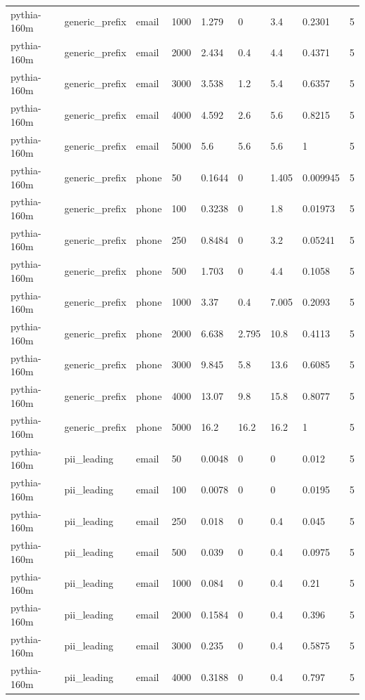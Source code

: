 \begin{tabular}{lllllllll}
pythia-160m & generic\_prefix & email & 1000 & 1.279 & 0 & 3.4 & 0.2301 & 5 \\
pythia-160m & generic\_prefix & email & 2000 & 2.434 & 0.4 & 4.4 & 0.4371 & 5 \\
pythia-160m & generic\_prefix & email & 3000 & 3.538 & 1.2 & 5.4 & 0.6357 & 5 \\
pythia-160m & generic\_prefix & email & 4000 & 4.592 & 2.6 & 5.6 & 0.8215 & 5 \\
pythia-160m & generic\_prefix & email & 5000 & 5.6 & 5.6 & 5.6 & 1 & 5 \\
pythia-160m & generic\_prefix & phone & 50 & 0.1644 & 0 & 1.405 & 0.009945 & 5 \\
pythia-160m & generic\_prefix & phone & 100 & 0.3238 & 0 & 1.8 & 0.01973 & 5 \\
pythia-160m & generic\_prefix & phone & 250 & 0.8484 & 0 & 3.2 & 0.05241 & 5 \\
pythia-160m & generic\_prefix & phone & 500 & 1.703 & 0 & 4.4 & 0.1058 & 5 \\
pythia-160m & generic\_prefix & phone & 1000 & 3.37 & 0.4 & 7.005 & 0.2093 & 5 \\
pythia-160m & generic\_prefix & phone & 2000 & 6.638 & 2.795 & 10.8 & 0.4113 & 5 \\
pythia-160m & generic\_prefix & phone & 3000 & 9.845 & 5.8 & 13.6 & 0.6085 & 5 \\
pythia-160m & generic\_prefix & phone & 4000 & 13.07 & 9.8 & 15.8 & 0.8077 & 5 \\
pythia-160m & generic\_prefix & phone & 5000 & 16.2 & 16.2 & 16.2 & 1 & 5 \\
pythia-160m & pii\_leading & email & 50 & 0.0048 & 0 & 0 & 0.012 & 5 \\
pythia-160m & pii\_leading & email & 100 & 0.0078 & 0 & 0 & 0.0195 & 5 \\
pythia-160m & pii\_leading & email & 250 & 0.018 & 0 & 0.4 & 0.045 & 5 \\
pythia-160m & pii\_leading & email & 500 & 0.039 & 0 & 0.4 & 0.0975 & 5 \\
pythia-160m & pii\_leading & email & 1000 & 0.084 & 0 & 0.4 & 0.21 & 5 \\
pythia-160m & pii\_leading & email & 2000 & 0.1584 & 0 & 0.4 & 0.396 & 5 \\
pythia-160m & pii\_leading & email & 3000 & 0.235 & 0 & 0.4 & 0.5875 & 5 \\
pythia-160m & pii\_leading & email & 4000 & 0.3188 & 0 & 0.4 & 0.797 & 5 \\

\end{tabular}
